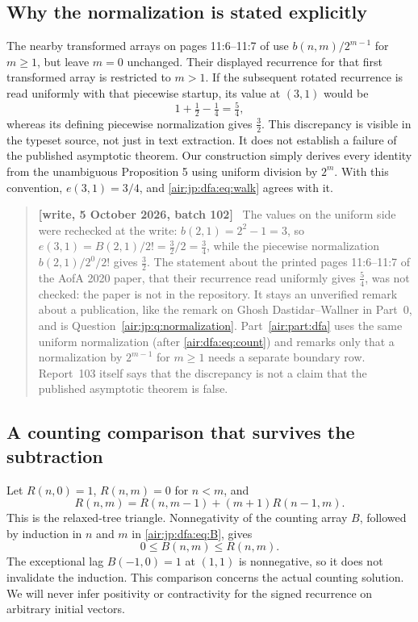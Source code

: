 \documentclass[11pt,letterpaper]{article}
\numberwithin{equation}{section}
\theoremstyle{remark}
\newenvironment{writenotejp}{\par\smallskip\begin{quote}\small\textbf{[write, 5 October 2026, batch 102]}\ }{\end{quote}\smallskip}
\begin{document}
\subsection{Why the normalization is stated explicitly}
The nearby transformed arrays on pages 11:6--11:7 of \cite{dfa} use $b(n,m)/2^{m-1}$ for $m\ge1$, but leave $m=0$ unchanged. Their displayed recurrence for that first transformed array is restricted to $m>1$. If the subsequent rotated recurrence is read uniformly with that piecewise startup, its value at $(3,1)$ would be
\[
 1+\tfrac12-\tfrac14=\tfrac54,
\]
whereas its defining piecewise normalization gives $\tfrac32$. This discrepancy is visible in the typeset source, not just in text extraction. It does not establish a failure of the published asymptotic theorem. Our construction simply derives every identity from the unambiguous Proposition 5 using uniform division by $2^m$. With this convention, $e(3,1)=3/4$, and \eqref{air:jp:dfa:eq:walk} agrees with it.
\begin{writenotejp}
The values on the uniform side were rechecked at the write: $b(2,1)=2^2-1=3$, so $e(3,1)=B(2,1)/2!=\frac32/2=\frac34$, while the piecewise normalization $b(2,1)/2^{0}/2!$ gives $\frac32$. The statement about the printed pages 11:6--11:7 of the AofA 2020 paper, that their recurrence read uniformly gives $\frac54$, was not checked: the paper is not in the repository. It stays an unverified remark about a publication, like the remark on Ghosh Dastidar--Wallner in Part~0, and is Question~\ref{air:jp:q:normalization}. Part~\ref{air:part:dfa} uses the same uniform normalization (after \eqref{air:dfa:eq:count}) and remarks only that a normalization by $2^{m-1}$ for $m\ge1$ needs a separate boundary row. Report~103 itself says that the discrepancy is not a claim that the published asymptotic theorem is false.
\end{writenotejp}

\subsection{A counting comparison that survives the subtraction}
Let $R(n,0)=1$, $R(n,m)=0$ for $n<m$, and
\begin{equation}\label{air:jp:dfa:eq:relaxedtriangle}
 R(n,m)=R(n,m-1)+(m+1)R(n-1,m).
\end{equation}
This is the relaxed-tree triangle. Nonnegativity of the counting array $B$, followed by induction in $n$ and $m$ in \eqref{air:jp:dfa:eq:B}, gives
\begin{equation}\label{air:jp:dfa:eq:domination}
 0\le B(n,m)\le R(n,m).
\end{equation}
The exceptional lag $B(-1,0)=1$ at $(1,1)$ is nonnegative, so it does not invalidate the induction. This comparison concerns the actual counting solution. We will never infer positivity or contractivity for the signed recurrence on arbitrary initial vectors.
\end{document}
